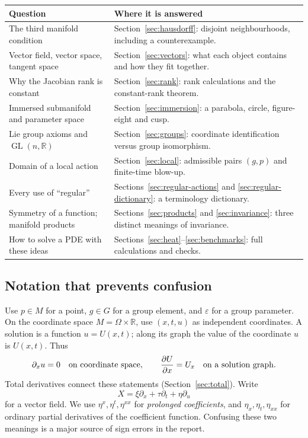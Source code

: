 \documentclass[11pt,a4paper]{article}
\numberwithin{equation}{section}
\theoremstyle{definition}
\theoremstyle{plain}
\theoremstyle{remark}
\newcommand{\R}{\mathbb R}
\newcommand{\GL}{\operatorname{GL}}
\begin{document}
\begin{tabularx}{\linewidth}{@{}p{.40\linewidth}Y@{}}
\toprule
Question & Where it is answered \\
\midrule
The third manifold condition & Section~\ref{sec:hausdorff}: disjoint neighbourhoods, including a counterexample.\\
Vector field, vector space, tangent space & Section~\ref{sec:vectors}: what each object contains and how they fit together.\\
Why the Jacobian rank is constant & Section~\ref{sec:rank}: rank calculations and the constant-rank theorem.\\
Immersed submanifold and parameter space & Section~\ref{sec:immersion}: a parabola, circle, figure-eight and cusp.\\
Lie group axioms and $\GL(n,\R)$ & Section~\ref{sec:groups}: coordinate identification versus group isomorphism.\\
Domain of a local action & Section~\ref{sec:local}: admissible pairs $(g,p)$ and finite-time blow-up.\\
Every use of ``regular'' & Sections~\ref{sec:regular-actions} and \ref{sec:regular-dictionary}: a terminology dictionary.\\
Symmetry of a function; manifold products & Sections~\ref{sec:products} and \ref{sec:invariance}: three distinct meanings of invariance.\\
How to solve a PDE with these ideas & Sections~\ref{sec:heat}--\ref{sec:benchmarks}: full calculations and checks.\\
\bottomrule
\end{tabularx}

\subsection{Notation that prevents confusion}
Use $p\in M$ for a point, $g\in G$ for a group element, and $\varepsilon$ for a group parameter. On the coordinate space $M=\Omega\times\R$, use $(x,t,u)$ as independent coordinates. A solution is a function $u=U(x,t)$; along its graph the value of the coordinate $u$ is $U(x,t)$. Thus
\[
\partial_xu=0\quad\hbox{on coordinate space},\qquad
\frac{\partial U}{\partial x}=U_x\quad\hbox{on a solution graph}.
\]
Total derivatives connect these statements (Section~\ref{sec:total}). Write
\[
X=\xi\partial_x+\tau\partial_t+\eta\partial_u
\]
for a vector field. We use $\eta^{x},\eta^{t},\eta^{xx}$ for \emph{prolonged coefficients}, and $\eta_x,\eta_t,\eta_{xx}$ for ordinary partial derivatives of the coefficient function. Confusing these two meanings is a major source of sign errors in the report.
\end{document}
